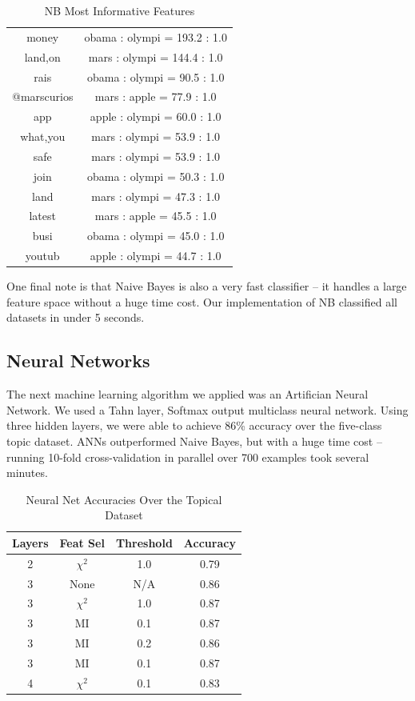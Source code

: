 \documentclass[fontsize=10pt,twocolumn,letterpaper,abstracton]{scrartcl}
\begin{document}
\begin{table}[H]
\centering
\begin{tabular}{ c | c }
money & obama : olympi =    193.2 : 1.0\\
land,on  & mars : olympi =    144.4 : 1.0\\
rais  & obama : olympi =     90.5 : 1.0\\
@marscurios  & mars : apple  =     77.9 : 1.0\\
app  & apple : olympi =     60.0 : 1.0\\
what,you  & mars : olympi =     53.9 : 1.0\\
safe  & mars : olympi =     53.9 : 1.0\\
join  & obama : olympi =     50.3 : 1.0\\
land  & mars : olympi =     47.3 : 1.0\\
latest & mars : apple  =     45.5 : 1.0\\
busi  & obama : olympi =     45.0 : 1.0\\
youtub  & apple : olympi =     44.7 : 1.0\\
\end{tabular}
\caption{NB Most Informative Features}
\label{tb:nb-inf}
\end{table}

One final note is that Naive Bayes is also a very fast classifier -- it handles a large feature space without a huge time cost.  Our implementation of NB classified all datasets in under 5 seconds.
\subsection{Neural Networks}
The next machine learning algorithm we applied was an Artifician Neural Network.  We used a Tahn layer, Softmax output multiclass neural network.  Using three hidden layers, we were able to achieve   86\% accuracy over the five-class topic dataset.  ANNs outperformed Naive Bayes, but with a huge time cost -- running 10-fold cross-validation in parallel over 700 examples took several minutes.

\begin{table}[H]
\centering
\begin{tabular}{ c | c | c | c}
Layers & Feat Sel & Threshold & Accuracy\\
\hline
2 & $\chi^{2}$ & 1.0 & 0.79\\
3 & None & N/A & 0.86\\
3 & $\chi^{2}$ & 1.0 & 0.87\\
3 & MI & 0.1 & 0.87\\
3 & MI & 0.2 & 0.86\\
3 & MI & 0.1 & 0.87\\
4 & $\chi^{2}$ & 0.1 & 0.83 \\
\end{tabular}
\caption{Neural Net Accuracies Over the Topical Dataset}
\label{tb:nb-inf}
\end{table}
\end{document}
